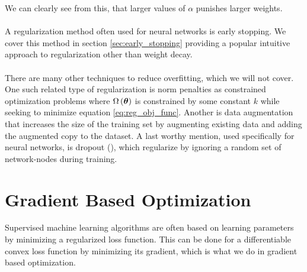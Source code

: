 We can clearly see from this, that larger values of $\alpha$ punishes larger weights. \\
\\
A regularization method often used for neural networks is early stopping. We cover this method in section \ref{sec:early_stopping} providing a popular intuitive approach to regularization other than weight decay. 
\\
\\
There are many other techniques to reduce overfitting, which we will not cover. One such related type of regularization is norm penalties as constrained optimization problems where $\Omega \left (\boldsymbol{\theta}\right)$ is constrained by some constant $k$ while seeking to minimize equation \ref{eq:reg_obj_func}. Another is data augmentation that increases the size of the training set by augmenting existing data and adding the augmented copy to the dataset. A last worthy mention, used specifically for neural networks, is dropout (\cite{srivastava2014dropout}), which regularize by ignoring a random set of network-nodes during training.

\section{Gradient Based Optimization}\label{sec:gradient_optimization}
Supervised machine learning algorithms are often based on learning parameters by minimizing a regularized loss function. This can be done for a differentiable convex loss function by minimizing its gradient, which is what we do in gradient based optimization. 

